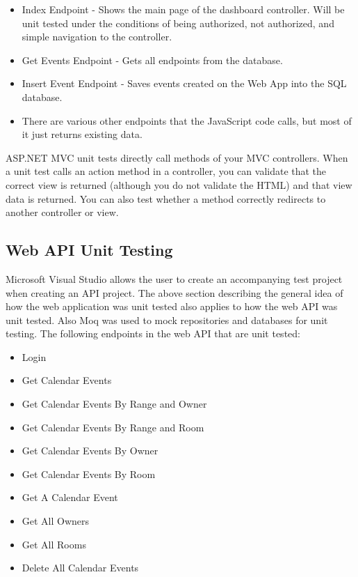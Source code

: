 \begin{itemize}
\item Index Endpoint - Shows the main page of the dashboard controller. Will be unit tested under the conditions of being authorized, not authorized, and simple navigation to the controller.
\item Get Events Endpoint - Gets all endpoints from the database. 
\item Insert Event Endpoint - Saves events created on the Web App into the SQL database.
\item There are various other endpoints that the JavaScript code calls, but most of it just returns existing data.
\end{itemize}

\noindent ASP.NET MVC unit tests directly call methods of your MVC controllers. When a unit test calls an action method in a controller, you can validate that the correct view is returned (although you do not validate the HTML) and that view data is returned. You can also test whether a method correctly redirects to another controller or view.

\subsection{Web API Unit Testing}
Microsoft Visual Studio allows the user to create an accompanying test project when creating an API project.  The above section describing the general idea of how the web application was unit tested also applies to how the web API was unit tested. Also Moq was used to  mock repositories and databases for unit testing. The following endpoints in the web API that are unit tested:

\begin{itemize}
\item Login
\item Get Calendar Events
\item Get Calendar Events By Range and Owner
\item Get Calendar Events By Range and Room
\item Get Calendar Events By Owner
\item Get Calendar Events By Room
\item Get A Calendar Event
\item Get All Owners
\item Get All Rooms
\item Delete All Calendar Events
\end{itemize}

